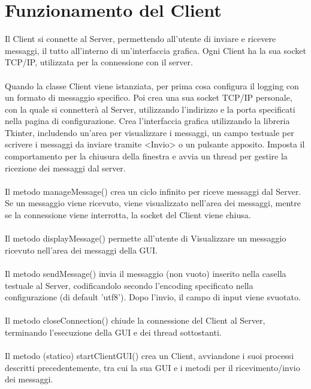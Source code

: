 \documentclass[a4paper,12pt]{report}
\begin{document}
    \chapter*{Funzionamento del Client}

        Il Client si connette al Server, permettendo all'utente di inviare e ricevere messaggi, il tutto all'interno di un'interfaccia grafica.
        Ogni Client ha la sua socket TCP/IP, utilizzata per la connessione con il server.
        \\ \\
        Quando la classe Client viene istanziata, per prima cosa configura il logging con un formato di messaggio specifico.
        Poi crea una sua socket TCP/IP personale, con la quale si connetterà al Server, utilizzando l'indirizzo e la porta specificati nella pagina di configurazione.
        Crea l'interfaccia grafica utilizzando la libreria Tkinter, includendo un'area per visualizzare i messaggi, un campo testuale per scrivere i messaggi da inviare tramite <Invio> o un pulsante apposito. Imposta il comportamento per la chiusura della finestra e avvia un thread per gestire la ricezione dei messaggi dal server.
        \\ \\
        Il metodo manageMessage() crea un ciclo infinito per riceve messaggi dal Server. Se un messaggio viene ricevuto, viene visualizzato nell'area dei messaggi, mentre se la connessione viene interrotta, la socket del Client viene chiusa.
        \\ \\
        Il metodo displayMessage() permette all'utente di Visualizzare un messaggio ricevuto nell'area dei messaggi della GUI.
        \\ \\
        Il metodo sendMessage() invia il messaggio (non vuoto) inserito nella casella testuale al Server, codificandolo secondo l'encoding specificato nella configurazione (di default 'utf8').
        Dopo l'invio, il campo di input viene svuotato.
        \\ \\
        Il metodo closeConnection() chiude la connessione del Client al Server, terminando l'esecuzione della GUI e dei thread sottostanti.
        \\ \\
        Il metodo (statico) startClientGUI() crea un Client, avviandone i suoi processi descritti precedentemente, tra cui la sua GUI e i metodi per il ricevimento/invio dei messaggi.
\end{document}
